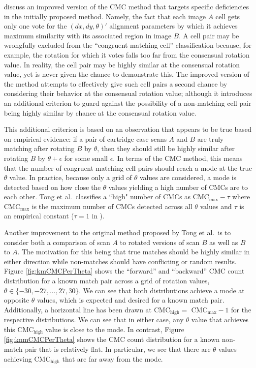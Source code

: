 \citet{tong_improved_2015} discuss an improved version of the CMC method
that targets specific deficiencies in the initially proposed method.
Namely, the fact that each image \(A\) cell gets only one vote for the
\((dx,dy,\theta)'\) alignment parameters by which it achieves maximum
similarity with its associated region in image \(B\). A cell pair may be
wrongfully excluded from the ``congruent matching cell'' classification
because, for example, the rotation for which it votes falls too far from
the consensual rotation value. In reality, the cell pair may be highly
similar at the consensual rotation value, yet is never given the chance
to demonstrate this. The improved version of the method attempts to
effectively give such cell pairs a second chance by considering their
behavior at the consensual rotation value; although it introduces an
additional criterion to guard against the possibility of a non-matching
cell pair being highly similar by chance at the consensual rotation
value.

This additional criterion is based on an observation that appears to be
true based on empirical evidence: if a pair of cartridge case scans
\(A\) and \(B\) are truly matching after rotating \(B\) by \(\theta\),
then they should still be highly similar after rotating \(B\) by
\(\theta + \epsilon\) for some small \(\epsilon\). In terms of the CMC
method, this means that the number of congruent matching cell pairs
should reach a mode at the true \(\theta\) value. In practice, because
only a grid of \(\theta\) values are considered, a mode is detected
based on how close the \(\theta\) values yielding a high number of CMCs
are to each other. Tong et al.~classifies a ``high" number of CMCs as
CMC\(_{\max} - \tau\) where CMC\(_{\max}\) is the maximum number of CMCs
detected across all \(\theta\) values and \(\tau\) is an empirical
constant (\(\tau = 1\) in \citet{tong_improved_2015}).

Another improvement to the original method proposed by Tong et al.~is to
consider both a comparison of scan \(A\) to rotated versions of scan
\(B\) as well as \(B\) to \(A\). The motivation for this being that true
matches should be highly similar in either direction while non-matches
should have conflicting or random results. Figure
\ref{fig:kmCMCPerTheta} shows the ``forward'' and ``backward'' CMC count
distribution for a known match pair across a grid of rotation values,
\(\theta \in \{-30,-27,...,27,30\}\). We can see that both distributions
achieve a mode at opposite \(\theta\) values, which is expected and
desired for a known match pair. Additionally, a horizontal line has been
drawn at CMC\(_{\text{high}} =\) CMC\(_{\max} - 1\) for the respective
distributions. We can see that in either case, any \(\theta\) value that
achieves this CMC\(_{\text{high}}\) value is close to the mode. In
contrast, Figure \ref{fig:knmCMCPerTheta} shows the CMC count
distribution for a known non-match pair that is relatively flat. In
particular, we see that there are \(\theta\) values achieving
CMC\(_{\text{high}}\) that are far away from the mode.

